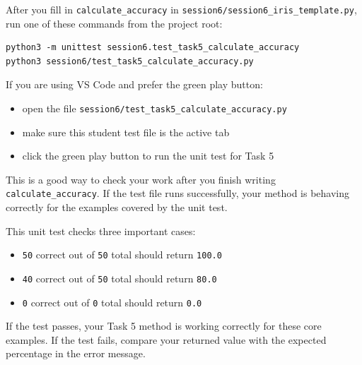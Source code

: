 \begin{tcolorbox}[title=How to test Task 5 with a unit test]
After you fill in \texttt{calculate\_accuracy} in \texttt{session6/session6\_iris\_template.py}, run one of these commands from the project root:

\begin{verbatim}
python3 -m unittest session6.test_task5_calculate_accuracy
python3 session6/test_task5_calculate_accuracy.py
\end{verbatim}



\noindent
If you are using VS Code and prefer the green play button:
\begin{itemize}\setlength{\itemsep}{2pt}
    \item open the file \texttt{session6/test\_task5\_calculate\_accuracy.py}
    \item make sure this student test file is the active tab
    \item click the green play button to run the unit test for Task 5
\end{itemize}

\noindent
This is a good way to check your work after you finish writing \texttt{calculate\_accuracy}.
If the test file runs successfully, your method is behaving correctly for the examples covered by the unit test.

\noindent
This unit test checks three important cases:
\begin{itemize}\setlength{\itemsep}{2pt}
    \item \texttt{50} correct out of \texttt{50} total should return \texttt{100.0}
    \item \texttt{40} correct out of \texttt{50} total should return \texttt{80.0}
    \item \texttt{0} correct out of \texttt{0} total should return \texttt{0.0}
\end{itemize}

\noindent
If the test passes, your Task 5 method is working correctly for these core examples.
If the test fails, compare your returned value with the expected percentage in the error message.
\end{tcolorbox}

